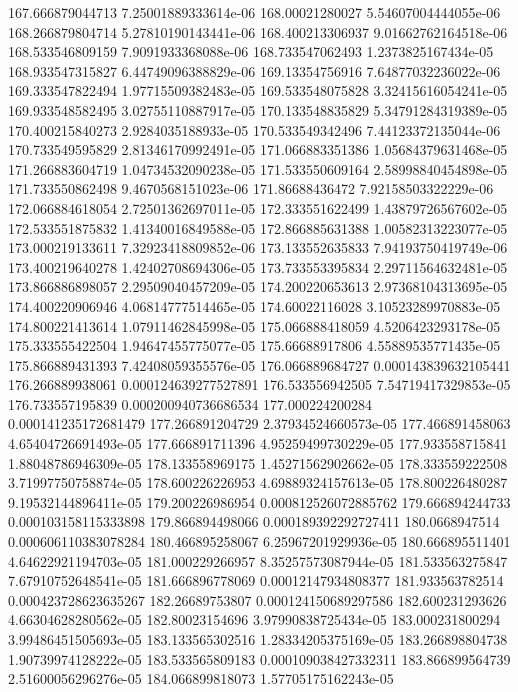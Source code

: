 {167.666879044713 7.25001889333614e-06
168.00021280027 5.54607004444055e-06
168.266879804714 5.27810190143441e-06
168.400213306937 9.01662762164518e-06
168.533546809159 7.9091933368088e-06
168.733547062493 1.2373825167434e-05
168.933547315827 6.44749096388829e-06
169.13354756916 7.64877032236022e-06
169.333547822494 1.97715509382483e-05
169.533548075828 3.32415616054241e-05
169.933548582495 3.02755110887917e-05
170.133548835829 5.34791284319389e-05
170.400215840273 2.9284035188933e-05
170.533549342496 7.44123372135044e-06
170.733549595829 2.81346170992491e-05
171.066883351386 1.05684379631468e-05
171.266883604719 1.04734532090238e-05
171.533550609164 2.58998840454898e-05
171.733550862498 9.4670568151023e-06
171.86688436472 7.92158503322229e-06
172.066884618054 2.72501362697011e-05
172.333551622499 1.43879726567602e-05
172.533551875832 1.41340016849588e-05
172.866885631388 1.00582313223077e-05
173.000219133611 7.32923418809852e-06
173.133552635833 7.94193750419749e-06
173.400219640278 1.42402708694306e-05
173.733553395834 2.29711564632481e-05
173.866886898057 2.29509040457209e-05
174.200220653613 2.97368104313695e-05
174.400220906946 4.06814777514465e-05
174.60022116028 3.10523289970883e-05
174.800221413614 1.07911462845998e-05
175.066888418059 4.5206423293178e-05
175.333555422504 1.94647455775077e-05
175.66688917806 4.55889535771435e-05
175.866889431393 7.42408059355576e-05
176.066889684727 0.000143839632105441
176.266889938061 0.000124639277527891
176.533556942505 7.54719417329853e-05
176.733557195839 0.000200940736686534
177.000224200284 0.000141235172681479
177.266891204729 2.37934524660573e-05
177.466891458063 4.65404726691493e-05
177.666891711396 4.95259499730229e-05
177.933558715841 1.88048786946309e-05
178.133558969175 1.45271562902662e-05
178.333559222508 3.71997750758874e-05
178.600226226953 4.69889324157613e-05
178.800226480287 9.19532144896411e-05
179.200226986954 0.000812526072885762
179.666894244733 0.000103158115333898
179.866894498066 0.000189392292727411
180.0668947514 0.000606110383078284
180.466895258067 6.25967201929936e-05
180.666895511401 4.64622921194703e-05
181.000229266957 8.35257573087944e-05
181.533563275847 7.67910752648541e-05
181.666896778069 0.00012147934808377
181.933563782514 0.000423728623635267
182.26689753807 0.000124150689297586
182.600231293626 4.66304628280562e-05
182.80023154696 3.97990838725434e-05
183.000231800294 3.99486451505693e-05
183.133565302516 1.28334205375169e-05
183.266898804738 1.90739974128222e-05
183.533565809183 0.000109038427332311
183.866899564739 2.51600056296276e-05
184.066899818073 1.57705175162243e-05
}
